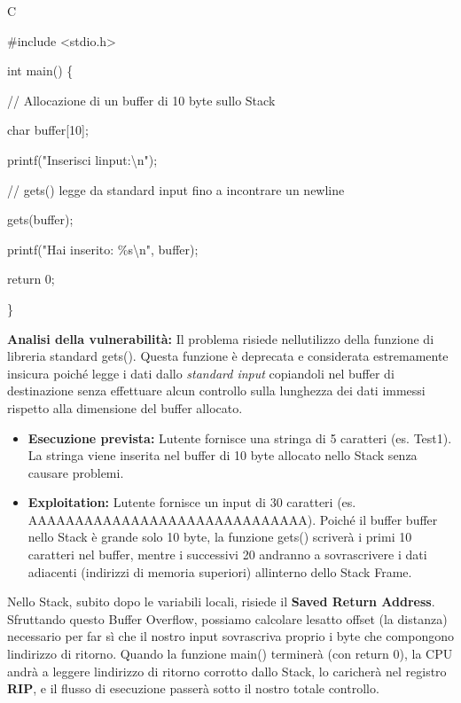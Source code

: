 \documentclass[11pt,a4paper]{article}
\begin{document}
C

\#include \textless stdio.h\textgreater{}

int main() \{

// Allocazione di un buffer di 10 byte sullo Stack

char buffer{[}10{]};

printf("Inserisci l\textquotesingle input:\textbackslash n");

// gets() legge da standard input fino a incontrare un newline

gets(buffer);

printf("Hai inserito: \%s\textbackslash n", buffer);

return 0;

\}

\textbf{Analisi della vulnerabilità:} Il problema risiede
nell\textquotesingle utilizzo della funzione di libreria standard
gets(). Questa funzione è deprecata e considerata estremamente insicura
poiché legge i dati dallo \emph{standard input} copiandoli nel buffer di
destinazione senza effettuare alcun controllo sulla lunghezza dei dati
immessi rispetto alla dimensione del buffer allocato.

\begin{itemize}
\item
  \textbf{Esecuzione prevista:} L\textquotesingle utente fornisce una
  stringa di 5 caratteri (es. Test1). La stringa viene inserita nel
  buffer di 10 byte allocato nello Stack senza causare problemi.
\item
  \textbf{Exploitation:} L\textquotesingle utente fornisce un input di
  30 caratteri (es. AAAAAAAAAAAAAAAAAAAAAAAAAAAAAA). Poiché il buffer
  buffer nello Stack è grande solo 10 byte, la funzione gets() scriverà
  i primi 10 caratteri nel buffer, mentre i successivi 20 andranno a
  sovrascrivere i dati adiacenti (indirizzi di memoria superiori)
  all\textquotesingle interno dello Stack Frame.
\end{itemize}

Nello Stack, subito dopo le variabili locali, risiede il \textbf{Saved
Return Address}. Sfruttando questo Buffer Overflow, possiamo calcolare
l\textquotesingle esatto offset (la distanza) necessario per far sì che
il nostro input sovrascriva proprio i byte che compongono
l\textquotesingle indirizzo di ritorno. Quando la funzione main()
terminerà (con return 0), la CPU andrà a leggere
l\textquotesingle indirizzo di ritorno corrotto dallo Stack, lo
caricherà nel registro \textbf{RIP}, e il flusso di esecuzione passerà
sotto il nostro totale controllo.
\end{document}
